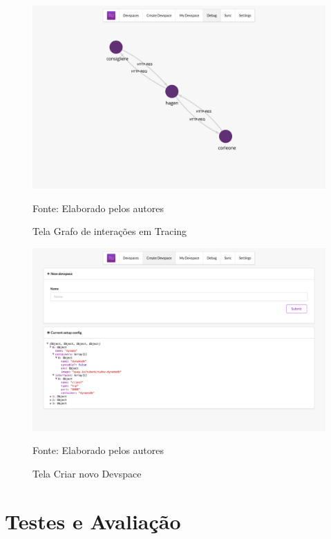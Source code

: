 \documentclass[twosideprint]{politex}
\newcommand{\legend}[1]{\begin{center}\def\caption{}\caption{#1}\end{center}}
\begin{document}
\begin{figure}[htb]
		\caption{\label{fig_frontend_tracing}Tela Grafo de interações em Tracing}
		\begin{center}
		\includegraphics[width=\textwidth,keepaspectratio]{pictures/frontend/frontend-tracing.png}
		\end{center}
		\legend{Fonte: Elaborado pelos autores}
	\end{figure}

\begin{figure}[htb]
		\caption{\label{fig_frontend_create_devspace}Tela Criar novo Devspace}
		\begin{center}
		\includegraphics[width=\textwidth,keepaspectratio]{pictures/frontend/frontend-create-devspace.png}
		\end{center}
		\legend{Fonte: Elaborado pelos autores}
	\end{figure}

\chapter{Testes e Avaliação}
\end{document}
